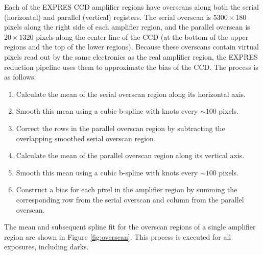 Each of the EXPRES CCD amplifier regions have overscans along both the serial (horizontal) and parallel (vertical) registers. The serial overscan is $5300 \times 180$ pixels along the right side of each amplifier region, and the parallel overscan is $20 \times 1320$ pixels along the center line of the CCD (at the bottom of the upper regions and the top of the lower regions). Because these overscans contain virtual pixels read out by the same electronics as the real amplifier region, the EXPRES reduction pipeline uses them to approximate the bias of the CCD.  The process is as follows:
\begin{enumerate}
    \item Calculate the mean of the serial overscan region along its horizontal axis.
    \item Smooth this mean using a cubic b-spline with knots every $\sim 100$ pixels.
    \item Correct the rows in the parallel overscan region by subtracting the overlapping smoothed serial overscan region.
    \item Calculate the mean of the parallel overscan region along its vertical axis.
    \item Smooth this mean using a cubic b-spline with knots every $\sim 100$ pixels.
    \item Construct a bias for each pixel in the amplifier region by summing the corresponding row from the serial overscan and column from the parallel overscan.
\end{enumerate}
The mean and subsequent spline fit for the overscan regions of a single amplifier region are shown in Figure \ref{fig:overscan}. This process is executed for all exposures, including darks.

